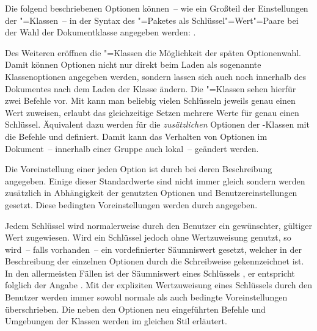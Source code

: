 Die folgend beschriebenen Optionen können~-- wie ein Großteil der Einstellungen 
der \KOMAScript"=Klassen~-- in der Syntax des "=Paketes als 
Schlüssel"=Wert"=Paare bei der Wahl der Dokumentklasse angegeben werden:
%
.

Des Weiteren eröffnen die \KOMAScript"=Klassen die Möglichkeit der späten 
Optionenwahl. Damit können Optionen nicht nur direkt beim Laden als sogenannte 
Klassenoptionen angegeben werden, sondern lassen sich auch noch innerhalb des 
Dokumentes nach dem Laden der Klasse ändern. Die \KOMAScript"=Klassen sehen 
hierfür zwei Befehle vor. Mit 
kann man beliebig vielen Schlüsseln jeweils genau einen Wert zuweisen, 
 erlaubt das 
gleichzeitige Setzen mehrere Werte für genau einen Schlüssel. Äquivalent 
dazu werden für die \emph{zusätzlichen} Optionen der \TUDScript-Klassen mit 
die Befehle  und 
 definiert. Damit kann
das Verhalten von Optionen im Dokument~-- innerhalb einer Gruppe auch lokal~-- 
geändert werden.

Die Voreinstellung einer jeden Option ist durch 
bei deren Beschreibung angegeben. Einige dieser Standardwerte sind nicht 
immer gleich sondern werden zusätzlich in Abhängigkeit der genutzten Optionen 
und Benutzereinstellungen gesetzt. Diese bedingten Voreinstellungen werden durch
\PValue{\,|\,}\PValue{:\,}%
 angegeben.

Jedem Schlüssel wird normalerweise durch den Benutzer ein gewünschter, gültiger 
Wert zugewiesen. Wird ein Schlüssel jedoch ohne Wertzuweisung genutzt, so 
wird~-- falls vorhanden~-- ein vordefinierter Säumniswert gesetzt, welcher in 
der Beschreibung der einzelnen Optionen durch die  
Schreibweise gekennzeichnet ist. In den allermeisten Fällen ist der Säumniswert
eines Schlüssels , er entspricht folglich der Angabe 
. Mit der expliziten Wertzuweisung 
eines Schlüssels durch den Benutzer werden immer sowohl normale als auch 
bedingte Voreinstellungen überschrieben. Die neben den Optionen neu 
eingeführten Befehle und Umgebungen der Klassen werden im gleichen Stil 
erläutert.



